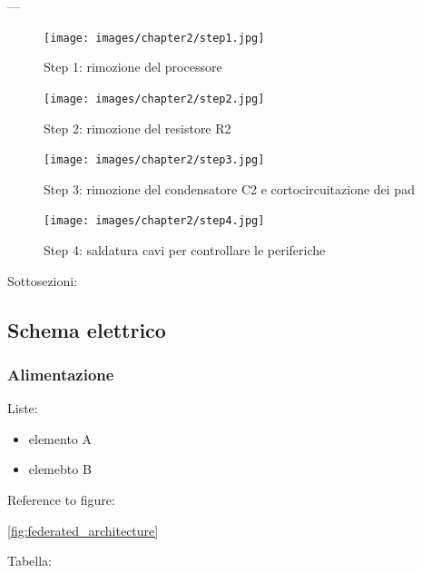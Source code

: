 ---

\begin{figure}[H]
    \centering
    \begin{minipage}[b]{0.45\textwidth}
      \texttt{[image: images/chapter2/step1.jpg]}
      \caption{Step 1: rimozione del processore}
      \label{fig:step1}
    \end{minipage}
    \hfill
    \begin{minipage}[b]{0.45\textwidth}
      \texttt{[image: images/chapter2/step2.jpg]}
      \caption{Step 2: rimozione del resistore R2}
      \label{fig:step2}
      \end{minipage}
  \end{figure}
  
  \begin{figure}[H]
    \centering
    \begin{minipage}[b]{0.45\textwidth}
      \texttt{[image: images/chapter2/step3.jpg]}
      \caption{Step 3: rimozione del condensatore C2 e cortocircuitazione dei pad}
      \label{fig:step2}  
    \end{minipage}
    \hfill
    \begin{minipage}[b]{0.45\textwidth}
      \texttt{[image: images/chapter2/step4.jpg]}
      \caption{Step 4: saldatura cavi per controllare le periferiche}
      \label{fig:step2}
        \end{minipage}
\end{figure}

Sottosezioni:

\subsection{Schema elettrico}

\subsubsection{Alimentazione}

Liste:

\begin{itemize}
  \setlength{\itemsep}{5pt}
  \setlength{\parskip}{5pt}
  \item elemento A
  \item elemebto B
\end{itemize}


Reference to figure:

\ref{fig:federated_architecture}


Tabella:

